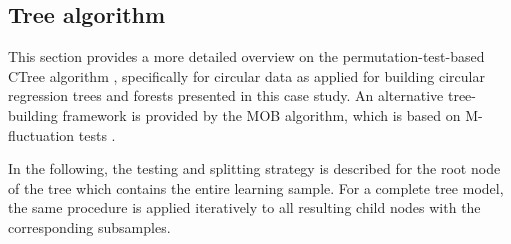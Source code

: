 \documentclass[nojss,shortnames]{jss}
\numberwithin{equation}{section}
\begin{document}
\newpage
\begin{appendix}

\section{Tree algorithm}
\label{app:algorithm}
This section provides a more detailed overview on the permutation-test-based
CTree algorithm \citep{Hothorn+Hornik+Zeileis:2006}, specifically for circular
data as applied for building circular regression trees and forests presented in
this case study. An alternative tree-building framework is provided by the MOB
algorithm, which is based on M-fluctuation tests \citep[see][for more
details]{Zeileis+Hothorn+Hornik:2008}.

In the following, the testing and splitting strategy is described for the root
node of the tree which contains the entire learning sample. For a complete
tree model, the same procedure is applied iteratively to all resulting child
nodes with the corresponding subsamples.


\end{appendix}
\end{document}
